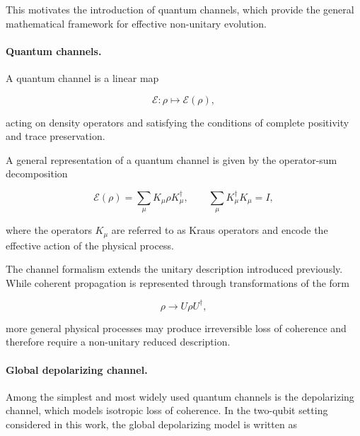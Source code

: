 \medskip

This motivates the introduction of quantum channels, which provide the general mathematical framework for effective non-unitary evolution.

\medskip

\paragraph{Quantum channels.}

A quantum channel is a linear map

\begin{equation}
\mathcal{E}:\rho \mapsto \mathcal{E}(\rho),
\label{eq:quantum_channel_map}
\end{equation}

acting on density operators and satisfying the conditions of complete positivity and trace preservation.

\medskip

A general representation of a quantum channel is given by the operator-sum decomposition~\cite{nielsen_chuang_qcqi,kraus1971general}

\begin{equation}
\mathcal{E}(\rho)
=
\sum_{\mu}
K_{\mu}
\rho
K_{\mu}^{\dagger},
\qquad
\sum_{\mu}
K_{\mu}^{\dagger}K_{\mu}
=
I,
\label{eq:kraus_operator_sum}
\end{equation}

where the operators \( K_{\mu} \) are referred to as Kraus operators and encode the effective action of the physical process.

\medskip

The channel formalism extends the unitary description introduced previously. While coherent propagation is represented through transformations of the form

\[
\rho
\rightarrow
U \rho U^{\dagger},
\]

more general physical processes may produce irreversible loss of coherence and therefore require a non-unitary reduced description.

\medskip

\paragraph{Global depolarizing channel.}

Among the simplest and most widely used quantum channels is the depolarizing channel, which models isotropic loss of coherence. In the two-qubit setting considered in this work, the global depolarizing model is written as

